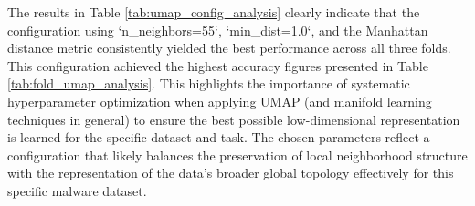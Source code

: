 The results in Table \ref{tab:umap_config_analysis} clearly indicate that the configuration using `n_neighbors=55`, `min_dist=1.0`, and the Manhattan distance metric consistently yielded the best performance across all three folds. This configuration achieved the highest accuracy figures presented in Table \ref{tab:fold_umap_analysis}. This highlights the importance of systematic hyperparameter optimization when applying UMAP (and manifold learning techniques in general) to ensure the best possible low-dimensional representation is learned for the specific dataset and task. The chosen parameters reflect a configuration that likely balances the preservation of local neighborhood structure with the representation of the data's broader global topology effectively for this specific malware dataset.
